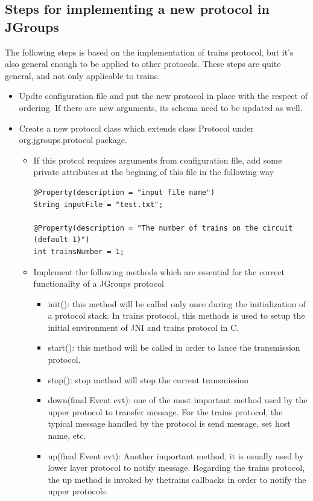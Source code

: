 \documentclass[a4paper,10pt]{report}
\begin{document}
\subsection{Steps for implementing a new protocol in JGroups}
The following steps is based on the implementation of trains protocol, but it's also general enough to be applied to other protocols.
These steps are quite general, and not only applicable to trains.
\begin{itemize}
\item Updte configuration file and put the new protocol in place with the respect of ordering. If there are new arguments, its schema need to be updated as well. 
\item Create a new protocol class which extends class Protocol under org.jgroups.protocol package. 
	\begin{itemize}
	\item If this protcol requires arguments from configuration file, add some private attributes at the begining of this file in the following way

\lstset{language=Java}
\lstset{commentstyle=\textit}
\begin{lstlisting}
@Property(description = "input file name")
String inputFile = "test.txt";

@Property(description = "The number of trains on the circuit (default 1)")
int trainsNumber = 1;
\end{lstlisting}

	\item Implement the following methods which are essential for the correct functionality of a JGroups protocol
		\begin{itemize}
		\item init(): this method will be called only once during the initialization of a protocol stack. 
			      In trains protocol, this methods is used to setup the initial environment of JNI and trains protocol in C.
		\item start(): this method will be called in order to lance the transmission protocol.
		\item stop(): stop method will stop the current transmission
		\item down(final Event evt): one of the most important method used by the upper protocol to transfer message. 
					     For the trains protocol, the typical message handled by the protocol is send message, set host name, etc.
					     
		\item up(final Event evt): Another important method, it is usually used by lower layer protocol to notify message. 
					   Regarding the trains protocol, the up method is invoked by thetrains callbacks in order to notify the upper protocols.



\end{itemize}
\end{itemize}
\end{itemize}
\end{document}
